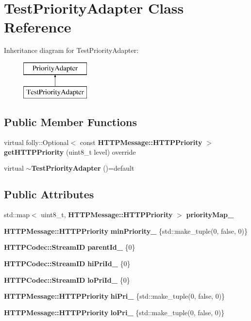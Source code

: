 \section{Test\+Priority\+Adapter Class Reference}
\label{classTestPriorityAdapter}
Inheritance diagram for Test\+Priority\+Adapter\+:\begin{figure}[H]
\begin{center}
\leavevmode
\includegraphics[height=2.000000cm]{classTestPriorityAdapter}
\end{center}
\end{figure}
\subsection*{Public Member Functions}
\begin{DoxyCompactItemize}
\item 
virtual folly\+::\+Optional$<$ const {\bf H\+T\+T\+P\+Message\+::\+H\+T\+T\+P\+Priority} $>$ {\bf get\+H\+T\+T\+P\+Priority} (uint8\+\_\+t level) override
\item 
virtual {\bf $\sim$\+Test\+Priority\+Adapter} ()=default
\end{DoxyCompactItemize}
\subsection*{Public Attributes}
\begin{DoxyCompactItemize}
\item 
std\+::map$<$ uint8\+\_\+t, {\bf H\+T\+T\+P\+Message\+::\+H\+T\+T\+P\+Priority} $>$ {\bf priority\+Map\+\_\+}
\item 
{\bf H\+T\+T\+P\+Message\+::\+H\+T\+T\+P\+Priority} {\bf min\+Priority\+\_\+} \{std\+::make\+\_\+tuple(0, false, 0)\}
\item 
{\bf H\+T\+T\+P\+Codec\+::\+Stream\+ID} {\bf parent\+Id\+\_\+} \{0\}
\item 
{\bf H\+T\+T\+P\+Codec\+::\+Stream\+ID} {\bf hi\+Pri\+Id\+\_\+} \{0\}
\item 
{\bf H\+T\+T\+P\+Codec\+::\+Stream\+ID} {\bf lo\+Pri\+Id\+\_\+} \{0\}
\item 
{\bf H\+T\+T\+P\+Message\+::\+H\+T\+T\+P\+Priority} {\bf hi\+Pri\+\_\+} \{std\+::make\+\_\+tuple(0, false, 0)\}
\item 
{\bf H\+T\+T\+P\+Message\+::\+H\+T\+T\+P\+Priority} {\bf lo\+Pri\+\_\+} \{std\+::make\+\_\+tuple(0, false, 0)\}
\end{DoxyCompactItemize}


